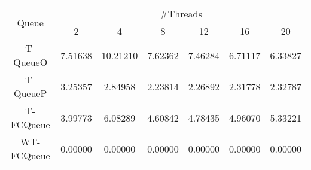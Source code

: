 \begin{tabular}{|c|c|c|c|c|c|c|}
\hline
\multirow{2}{*}{Queue} & \multicolumn{6}{c|}{\#Threads}\\\cline{2-7}& 2 & 4 & 8 & 12 & 16 & 20\\
\hline
\hline
T-QueueO & 7.51638 & 10.21210 & 7.62362 & 7.46284 & 6.71117 & 6.33827\\
T-QueueP & 3.25357 & 2.84958 & 2.23814 & 2.26892 & 2.31778 & 2.32787\\
T-FCQueue & 3.99773 & 6.08289 & 4.60842 & 4.78435 & 4.96070 & 5.33221\\
WT-FCQueue & 0.00000 & 0.00000 & 0.00000 & 0.00000 & 0.00000 & 0.00000\\
\hline\end{tabular}
